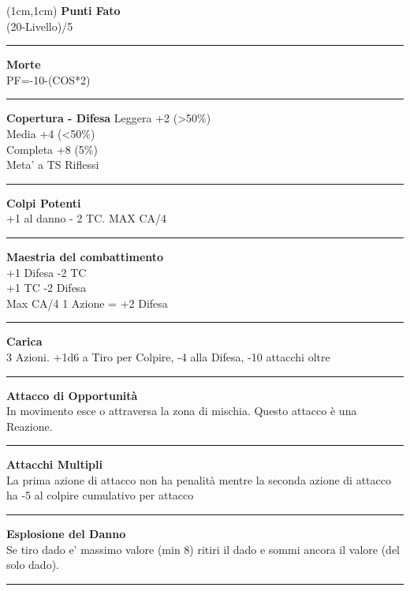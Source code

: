 \documentclass[a4paper,12 pt,openany]{book}
\newcommand{\riga}{\rule{\textwidth}{0.4pt}}
\begin{document}
\begin{textblock*}{4cm}(1cm,1cm) %
{\textbf{Punti Fato}\\
(20-Livello)/5}

\riga

{\textbf{Morte}\\
PF=-10-(COS*2)}

\riga

\textbf{Copertura - Difesa}
Leggera +2 (>50\%)\\
Media +4 (<50\%)\\
Completa +8 (5\%)\\
Meta' a TS Riflessi

\riga

\textbf{Colpi Potenti}\\
+1 al danno - 2 TC. MAX CA/4

\riga

\textbf{Maestria del combattimento}\\
+1 Difesa -2 TC\\
+1 TC -2 Difesa\\
Max CA/4
1 Azione = +2 Difesa

\riga

\textbf{Carica}\\
3 Azioni. +1d6 a Tiro per Colpire, -4 alla Difesa, -10 attacchi oltre

\riga

\textbf{Attacco di Opportunità}\\
In movimento esce o attraversa la zona di mischia. Questo attacco è una Reazione.

\riga

\textbf{Attacchi Multipli}\\
La prima azione di attacco non ha penalità mentre la seconda azione di attacco ha -5 al colpire cumulativo per attacco

\riga

\textbf{Esplosione del Danno}\\
Se tiro dado e' massimo valore (min 8) ritiri il dado e sommi ancora il valore (del solo dado).

\riga



\end{textblock*}
\end{document}
